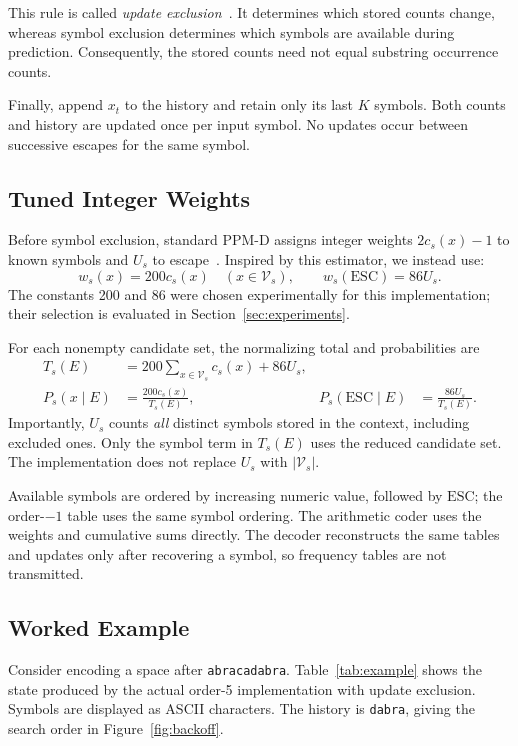 \documentclass[12pt,onecolumn]{article}
\newcommand{\ESC}{\mathrm{ESC}}
\newcommand{\byte}[1]{\texttt{#1}}
\begin{document}
This rule is called \emph{update exclusion}~\cite{teahan1995}. It determines
which stored counts change, whereas symbol exclusion determines which symbols
are available during prediction. Consequently, the stored counts need not equal
substring occurrence counts.

Finally, append $x_t$ to the history and retain only its last $K$ symbols.
Both counts and history are updated once per input symbol. No updates occur
between successive escapes for the same symbol.

\subsection{Tuned Integer Weights}

Before symbol exclusion, standard PPM-D assigns integer weights $2c_s(x)-1$
to known symbols and $U_s$ to escape~\cite{howard1992}. Inspired by this
estimator, we instead use:
\begin{equation}
  w_s(x)=200c_s(x)\quad(x\in\mathcal{V}_s),
  \qquad w_s(\ESC)=86U_s.
  \label{eq:weights}
\end{equation}
The constants 200 and 86 were chosen experimentally for this implementation;
their selection is evaluated in Section~\ref{sec:experiments}.

For each nonempty candidate set, the normalizing total and probabilities are
\begin{align}
  T_s(E)&=200\sum_{x\in\mathcal{V}_s}c_s(x)+86U_s,\\
  P_s(x\mid E)&=\frac{200c_s(x)}{T_s(E)},
  &P_s(\ESC\mid E)&=\frac{86U_s}{T_s(E)}.
  \label{eq:probabilities}
\end{align}
Importantly, $U_s$ counts \emph{all} distinct symbols stored in the context,
including excluded ones. Only the symbol term in $T_s(E)$ uses the reduced
candidate set. The implementation does not replace $U_s$ with
$|\mathcal{V}_s|$.

Available symbols are ordered by increasing numeric value, followed by $\ESC$;
the order-$-1$ table uses the same symbol ordering. The arithmetic coder uses the
weights and cumulative sums directly. The decoder reconstructs the same tables
and updates only after recovering a symbol, so frequency tables are not transmitted.

\subsection{Worked Example}

Consider encoding a space after \byte{abracadabra}. Table~\ref{tab:example} shows
the state produced by the actual order-5 implementation with update exclusion.
Symbols are displayed as ASCII characters. The history is \byte{dabra}, giving the search order
in Figure~\ref{fig:backoff}.
\end{document}
